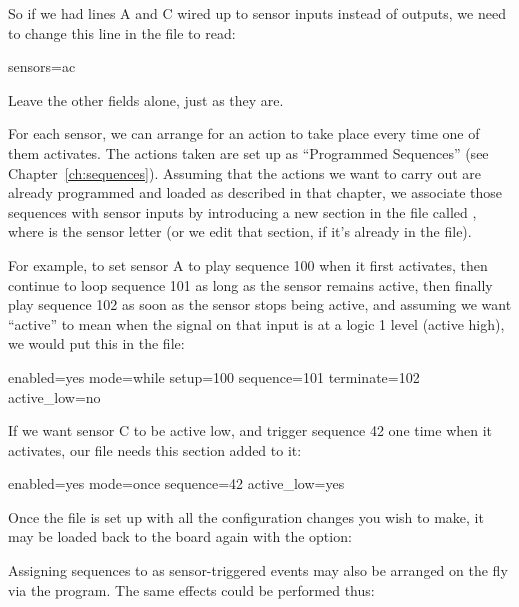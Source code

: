 \documentclass[letterpaper,twoside,onecolumn,openright,final]{memoir}
\begin{document}
So if we had lines A and C wired up to sensor inputs instead of  outputs, we need to 
change this line in the  file to read:

\begin{SourceCode}
sensors=ac
\end{SourceCode}

Leave the other fields alone, just as they are.

For each sensor, we can arrange for an action to take place every time one of them activates.
The actions taken are set up as ``Programmed Sequences'' (see Chapter~\ref{ch:sequences}).
Assuming that the actions we want to carry out are already programmed and loaded as described in
that chapter, we associate those sequences with sensor inputs by introducing a new section
in the  file called \z{[lumos\_device\_sensor\_}\z{]}, where 
 is the sensor letter (or we edit that section, if it's already in the file).

For example, to set sensor A to play sequence 100 when it first activates, then continue to loop
sequence 101 as long as the sensor remains active, then finally play sequence 102 as soon as the
sensor stops being active, and assuming we want ``active'' to mean when the signal on that input
is at a logic 1 level (active high), we would put this in the file:

\begin{SourceCode}
enabled=yes
mode=while
setup=100
sequence=101
terminate=102
active_low=no
\end{SourceCode}

If we want sensor C to be active low, and trigger sequence 42 one time when it activates, our 
file needs this section added to it:

\begin{SourceCode}
enabled=yes
mode=once
sequence=42
active_low=yes
\end{SourceCode}

Once the file is set up with all the configuration changes you wish to make, it may be 
loaded back to the board again with the  option:


Assigning sequences to as sensor-triggered events may also be arranged on the fly via
the  program.  The same effects could be performed thus:
\end{document}
